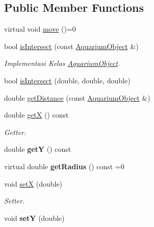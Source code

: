 \subsection*{Public Member Functions}
\begin{DoxyCompactItemize}
\item 
virtual void \mbox{\hyperlink{class_aquarium_object_a42c4de640f89ac8aebc26b7618578575}{move}} ()=0
\item 
bool \mbox{\hyperlink{class_aquarium_object_aef037932dbce5808ae170f272a392500}{is\+Intersect}} (const \mbox{\hyperlink{class_aquarium_object}{Aquarium\+Object}} \&)
\begin{DoxyCompactList}\small\item\em Implementasi Kelas \mbox{\hyperlink{class_aquarium_object}{Aquarium\+Object}}. \end{DoxyCompactList}\item 
bool \mbox{\hyperlink{class_aquarium_object_ac307c9bd7e4a5f6b02a4c64fcbd89e84}{is\+Intersect}} (double, double, double)
\item 
double \mbox{\hyperlink{class_aquarium_object_a6f1352441b05cfa398f0e5043b49c020}{get\+Distance}} (const \mbox{\hyperlink{class_aquarium_object}{Aquarium\+Object}} \&)
\item 
\mbox{\label{class_aquarium_object_aad5324d1ba80cab982ef5b5796980f11}} 
double \mbox{\hyperlink{class_aquarium_object_aad5324d1ba80cab982ef5b5796980f11}{getX}} () const
\begin{DoxyCompactList}\small\item\em Getter. \end{DoxyCompactList}\item 
\mbox{\label{class_aquarium_object_a3611ddc39149be85062a1a87960f00ff}} 
double {\bfseries getY} () const
\item 
\mbox{\label{class_aquarium_object_a5e1bda83ccc1acf0a4d15bc92fa46b6e}} 
virtual double {\bfseries get\+Radius} () const =0
\item 
\mbox{\label{class_aquarium_object_a45b53ca29ace6ac26e50c20520334751}} 
void \mbox{\hyperlink{class_aquarium_object_a45b53ca29ace6ac26e50c20520334751}{setX}} (double)
\begin{DoxyCompactList}\small\item\em Setter. \end{DoxyCompactList}\item 
\mbox{\label{class_aquarium_object_af6145ad914f088cdbbfb8515413fb44f}} 
void {\bfseries setY} (double)
\end{DoxyCompactItemize}


